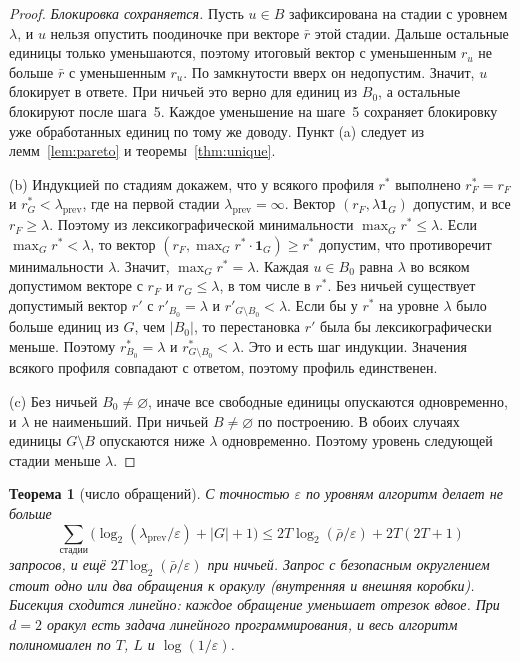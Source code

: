 \documentclass[a4paper,11pt]{article}
\theoremstyle{plain}
\newtheorem{theorem}{Теорема}[section]
\theoremstyle{definition}
\theoremstyle{remark}
\newcommand{\abs}[1]{\left\lvert #1 \right\rvert}
\begin{document}
\begin{proof}
    \emph{Блокировка сохраняется.} Пусть $u\in B$ зафиксирована на стадии с уровнем $\lambda$, и $u$ нельзя опустить поодиночке при векторе $\bar r$ этой стадии. Дальше остальные единицы только уменьшаются, поэтому итоговый вектор с уменьшенным $r_u$ не больше $\bar r$ с уменьшенным $r_u$. По замкнутости вверх он недопустим. Значит, $u$ блокирует в ответе. При ничьей это верно для единиц из $B_0$, а остальные блокируют после шага~5. Каждое уменьшение на шаге~5 сохраняет блокировку уже обработанных единиц по тому же доводу. Пункт (a) следует из лемм~\ref{lem:pareto} и теоремы~\ref{thm:unique}.

    (b) Индукцией по стадиям докажем, что у всякого профиля $r^*$ выполнено $r^*_F=r_F$ и $r^*_G<\lambda_{\mathrm{prev}}$, где на первой стадии $\lambda_{\mathrm{prev}}=\infty$. Вектор $(r_F,\lambda\mathbf 1_G)$ допустим, и все $r_F\ge\lambda$. Поэтому из лексикографической минимальности $\max_Gr^*\le\lambda$. Если $\max_Gr^*<\lambda$, то вектор $(r_F,\max_Gr^*\cdot\mathbf 1_G)\ge r^*$ допустим, что противоречит минимальности $\lambda$. Значит, $\max_Gr^*=\lambda$. Каждая $u\in B_0$ равна $\lambda$ во всяком допустимом векторе с $r_F$ и $r_G\le\lambda$, в том числе в $r^*$. Без ничьей существует допустимый вектор $r'$ с $r'_{B_0}=\lambda$ и $r'_{G\setminus B_0}<\lambda$. Если бы у $r^*$ на уровне $\lambda$ было больше единиц из $G$, чем $\abs{B_0}$, то перестановка $r'$ была бы лексикографически меньше. Поэтому $r^*_{B_0}=\lambda$ и $r^*_{G\setminus B_0}<\lambda$. Это и есть шаг индукции. Значения всякого профиля совпадают с ответом, поэтому профиль единственен.

    (c) Без ничьей $B_0\ne\varnothing$, иначе все свободные единицы опускаются одновременно, и $\lambda$ не наименьший. При ничьей $B\ne\varnothing$ по построению. В обоих случаях единицы $G\setminus B$ опускаются ниже $\lambda$ одновременно. Поэтому уровень следующей стадии меньше $\lambda$.
\end{proof}

\begin{theorem}[число обращений]\label{thm:calls}
    С точностью $\varepsilon$ по уровням алгоритм делает не больше
    \[
        \sum_{\text{стадии}}\bigl(\log_2(\lambda_{\mathrm{prev}}/\varepsilon)+\abs G+1\bigr)\le2T\log_2(\bar\rho/\varepsilon)+2T(2T+1)
    \]
    запросов, и ещё $2T\log_2(\bar\rho/\varepsilon)$ при ничьей. Запрос с безопасным округлением стоит одно или два обращения к оракулу (внутренняя и внешняя коробки). Бисекция сходится линейно: каждое обращение уменьшает отрезок вдвое. При $d=2$ оракул есть задача линейного программирования, и весь алгоритм полиномиален по $T$, $L$ и $\log(1/\varepsilon)$.
\end{theorem}
\end{document}
